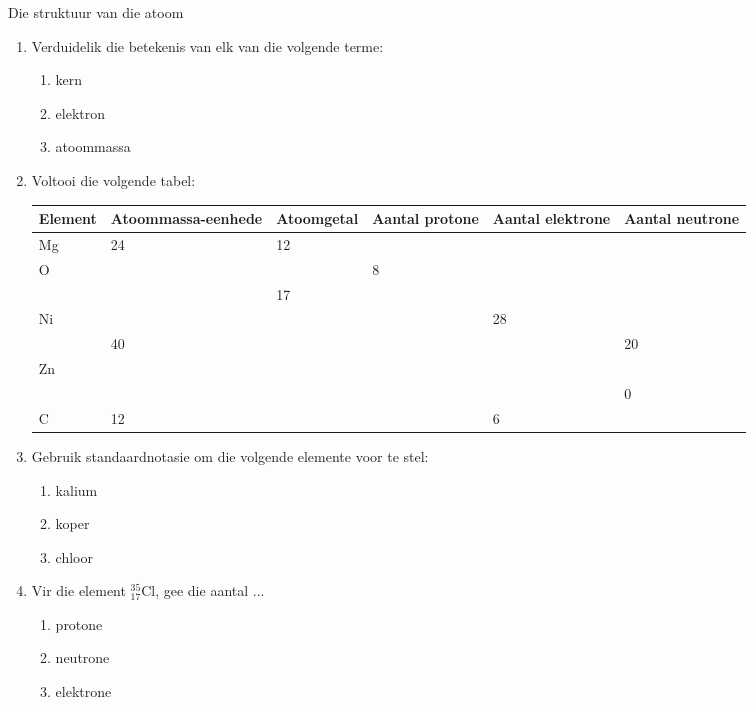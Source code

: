 \begin{exercises}{Die struktuur van die atoom} \noindent
\begin{enumerate}[noitemsep, label=\textbf{\arabic*}. ] 
\item Verduidelik die betekenis van elk van die volgende terme:
\begin{enumerate}[noitemsep, label=\textbf{\alph*}. ] 
\item kern
\item elektron
\item atoommassa
\end{enumerate}
\item Voltooi die volgende tabel:
\begin{center} 
\begin{tabular}{|p{1.4cm}|p{1.4cm}|p{1.4cm}|p{1.4cm}|p{1.4cm}|p{1.4cm}|}\hline
\textbf{Element} & \textbf{Atoom\-massa-eenhede} & \textbf{Atoomgetal} & \textbf{Aantal protone} & \textbf{Aantal elektrone} & \textbf{Aantal neutrone}\\\hline
Mg & 24 & 12 & & & \\\hline
O & & & 8 & & \\\hline
 & & 17 & & & \\\hline
Ni & & & & 28 & \\\hline
 & 40 & & & & 20 \\\hline
Zn & & & & & \\\hline
 & & & & & 0 \\\hline
C & 12 & & & 6 & \\\hline 
\end{tabular}
\end{center}
    \par
          \item Gebruik standaardnotasie om die volgende elemente voor te stel:
\begin{enumerate}[noitemsep, label=\textbf{\alph*}. ] 
            \item kalium
\item koper
\item chloor
\end{enumerate}
                \item 
Vir die element $_{17}^{35}\text{Cl}$, gee die aantal ...
\begin{enumerate}[noitemsep, label=\textbf{\alph*}. ] 
            \item protone
\item neutrone
\item elektrone

\end{enumerate}
\end{enumerate}
\end{exercises}
